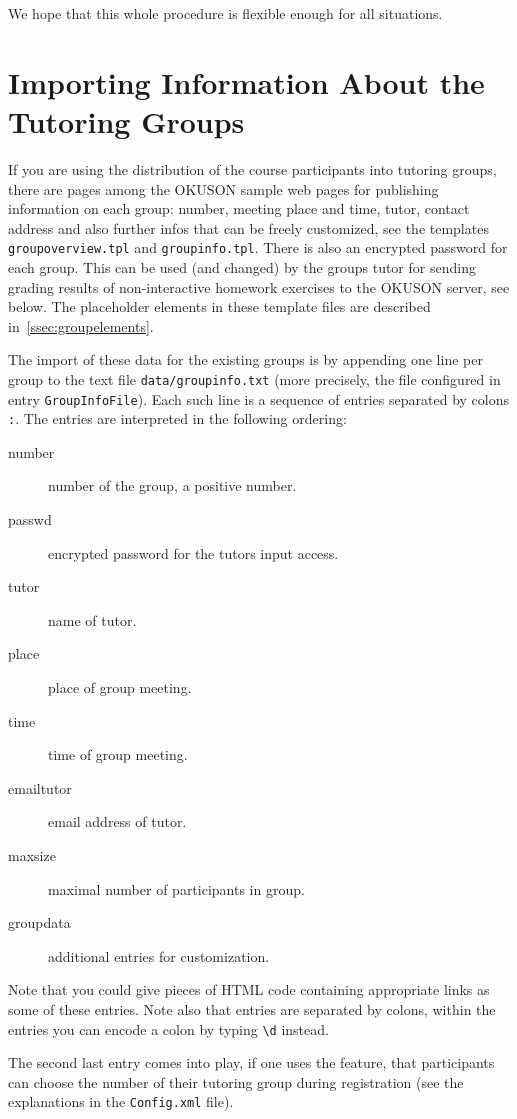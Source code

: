 \documentclass[12pt,openany,a4paper]{book}
\newcommand{\OKUSON}{\textsf{OKUSON}}
\begin{document}
We hope that this whole procedure is flexible enough for all situations.

\section{Importing Information About the Tutoring
Groups}\label{sec:groupinfo}

If you are using the distribution of the course participants into tutoring
groups, there are pages among the {\OKUSON} sample web pages for publishing 
information on each group: number, meeting place and time, tutor, contact
address and also further infos that can be freely customized, see the
templates \texttt{groupoverview.tpl} and \texttt{groupinfo.tpl}. There is
also an encrypted password for each group. This can be used (and changed) by
the groups tutor for sending grading results of non-interactive homework 
exercises to the {\OKUSON} server, see below. The placeholder elements in
these template files are described in~\ref{ssec:groupelements}.

The import of these data for the existing groups is by appending one line
per group to the text file \texttt{data/groupinfo.txt} (more precisely, the
file  configured in entry \texttt{GroupInfoFile}). Each such line is a
sequence of entries separated by colons \texttt{:}. The entries are
interpreted in the following ordering:

\begin{description}
\item[number] number of the group, a positive number.
\item[passwd] encrypted password for the tutors input access.
\item[tutor] name of tutor.
\item[place] place of group meeting.
\item[time]  time of group meeting.
\item[emailtutor] email address of tutor.
\item[maxsize] maximal number of participants in group.
\item[groupdata] additional entries for customization.
\end{description}

Note that you could give pieces of HTML code containing appropriate links as
some of these entries. Note also that entries are separated by colons, within 
the entries you can encode a colon by typing \verb+\d+ instead.

The second last entry comes into play, if one uses the feature, that
participants can choose the number of their tutoring group during
registration (see the explanations in the \texttt{Config.xml} file).
\end{document}
